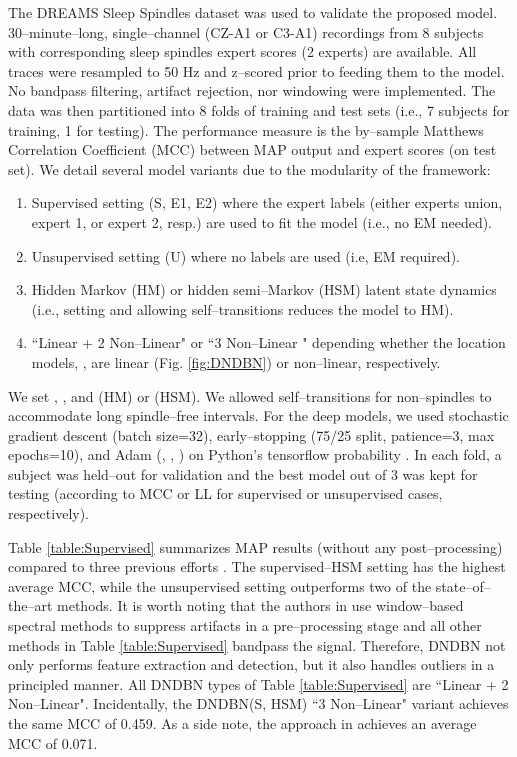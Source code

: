 \documentclass[runningheads]{llncs}
\begin{document}
The DREAMS Sleep Spindles dataset \cite{stephanie_devuyst_2005_2650142} was used to validate the proposed model. 30--minute--long, single--channel (CZ-A1 or C3-A1) recordings from 8 subjects with corresponding sleep spindles expert scores (2 experts) are available. All traces were resampled to 50 Hz and z--scored prior to feeding them to the model. No bandpass filtering, artifact rejection, nor windowing were implemented. The data was then partitioned into 8 folds of training and test sets (i.e., 7 subjects for training, 1 for testing). The performance measure is the by--sample Matthews Correlation Coefficient (MCC) between MAP output and expert scores (on test set). We detail several model variants due to the modularity of the framework: 
\begin{enumerate}[label=\alph*)]
	\item Supervised setting (S, E1, E2) where the expert labels (either experts union, expert 1, or expert 2, resp.) are used to fit the model (i.e., no EM needed).
	\item Unsupervised setting (U) where no labels are used (i.e, EM required).
	\item Hidden Markov (HM) or hidden semi--Markov (HSM) latent state dynamics (i.e., setting  and allowing self--transitions reduces the model to HM).
	 \item ``Linear + 2 Non--Linear" or ``3 Non--Linear " depending whether the location models, \theta, are linear (Fig. \ref{fig:DNDBN}) or non--linear, respectively.
\end{enumerate}

We set , , and  (HM) or  (HSM). We allowed self--transitions for non--spindles to accommodate long spindle--free intervals. For the deep models, we used stochastic gradient descent (batch size=32), early--stopping (75/25 split, patience=3, max epochs=10), and Adam \cite{kingma2014adam} (, , ) on Python's tensorflow probability \cite{dillon2017tensorflow}. In each fold, a subject was held--out for validation and the best model out of 3 was kept for testing (according to MCC or LL for supervised or unsupervised cases, respectively).

Table \ref{table:Supervised} summarizes MAP results (without any post--processing) compared to three previous efforts \cite{wendt2012validation,martin2013topography,parekh2014sleep}.
The supervised--HSM setting has the highest average MCC, while the unsupervised setting outperforms two of the state--of--the--art methods. It is worth noting that the authors in \cite{parekh2014sleep} use window--based spectral methods to suppress artifacts in a pre--processing stage and all other methods in Table \ref{table:Supervised} bandpass the signal. Therefore, DNDBN not only performs feature extraction and detection, but it also handles outliers in a principled manner. All DNDBN types of Table \ref{table:Supervised} are ``Linear + 2 Non--Linear". Incidentally, the DNDBN(S, HSM) ``3 Non--Linear" variant achieves the same MCC of 0.459. As a side note, the approach in \cite{penny1999dynamic} achieves an average MCC of 0.071.
\end{document}
